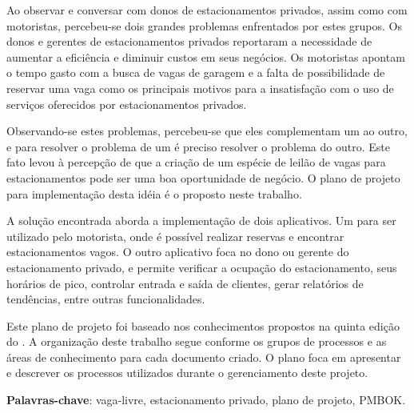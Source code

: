 \setlength{\absparsep}{18pt} %
\begin{resumo}

Ao observar e conversar com donos de estacionamentos privados, assim como com motoristas, percebeu-se dois grandes problemas enfrentados por estes grupos. Os donos e gerentes de estacionamentos privados reportaram a necessidade de aumentar a eficiência e diminuir custos em seus negócios. Os motoristas apontam o tempo gasto com a busca de vagas de garagem e a falta de possibilidade de reservar uma vaga como os principais motivos para a insatisfação com o uso de serviços oferecidos por estacionamentos privados. 

Observando-se estes problemas, percebeu-se que eles complementam um ao outro, e para resolver o problema de um é preciso resolver o problema do outro. Este fato levou à percepção de que a criação de um espécie de leilão de vagas para estacionamentos pode ser uma boa oportunidade de negócio. O plano de projeto para implementação desta idéia é o proposto neste trabalho. 

A solução encontrada aborda a implementação de dois aplicativos. Um para ser utilizado pelo motorista, onde é possível realizar reservas e encontrar estacionamentos vagos. O outro aplicativo foca no dono ou gerente do estacionamento privado, e permite verificar a ocupação do estacionamento, seus horários de pico, controlar entrada e saída de clientes, gerar relatórios de tendências, entre outras funcionalidades.

Este plano de projeto foi baseado nos conhecimentos propostos na quinta edição do \cite{project2013guia}. A organização deste trabalho segue conforme os grupos de processos e as áreas de conhecimento para cada documento criado. O plano foca em apresentar e descrever os processos utilizados durante o gerenciamento deste projeto.

 \textbf{Palavras-chave}: vaga-livre, estacionamento privado, plano de projeto, PMBOK.
\end{resumo}